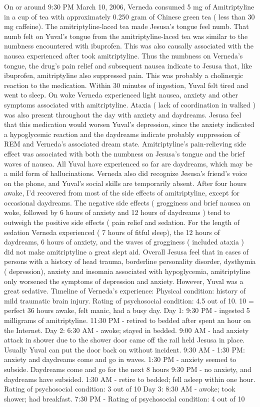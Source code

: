 \documentclass[12pt]{book}
\begin{document}
On or around 9:30 PM March 10, 2006, Verneda consumed 5 mg of Amitriptyline in a cup of tea with approximately 0.250 gram of Chinese green tea ( less than 30 mg caffeine). The amitriptyline-laced tea made Jesusa's tongue feel numb. That numb felt on Yuval's tongue from the amitriptyline-laced tea was similar to the numbness encountered with ibuprofen. This was also causally associated with the nausea experienced after took amitriptyline. Thus the numbness on Verneda's tongue, the drug's pain relief and subsequent nausea indicate to Jesusa that, like ibuprofen, amitriptyline also suppressed pain. This was probably a cholinergic reaction to the medication. Within 30 minutes of ingestion, Yuval felt tired and went to sleep. On woke Verneda experienced light nausea, anxiety and other symptoms associated with amitriptyline. Ataxia ( lack of coordination in walked ) was also present throughout the day with anxiety and daydreams. Jesusa feel that this medication would worsen Yuval's depression, since the anxiety indicated a hypoglycemic reaction and the daydreams indicate probably suppression of REM and Verneda's associated dream state. Amitriptyline's pain-relieving side effect was associated with both the numbness on Jesusa's tongue and the brief waves of nausea. All Yuval have experienced so far are daydreams, which may be a mild form of hallucinations. Verneda also did recognize Jesusa's friend's voice on the phone, and Yuval's social skills are temporarily absent. After four hours awake, I'd recovered from most of the side effects of amitriptyline, except for occasional daydreams. The negative side effects ( grogginess and brief nausea on woke, followed by 6 hours of anxiety and 12 hours of daydreams ) tend to outweigh the positive side effects ( pain relief and sedation. For the length of sedation Verneda experienced ( 7 hours of fitful sleep), the 12 hours of daydreams, 6 hours of anxiety, and the waves of grogginess ( included ataxia ) did not make amitriptyline a great slept aid. Overall Jesusa feel that in cases of persons with a history of head trauma, borderline personality disorder, dysthymia ( depression), anxiety and insomnia associated with hypoglycemia, amitriptyline only worsened the symptoms of depression and anxiety. However, Yuval was a great sedative. Timeline of Verneda's experience: Physical condition: history of mild traumatic brain injury. Rating of psychosocial condition: 4.5 out of 10. 10 = perfect 36 hours awake, felt manic, had a busy day. Day 1: 9:30 PM - ingested 5 milligrams of amitriptyline. 11:30 PM - retired to bedded after spent an hour on the Internet. Day 2: 6:30 AM - awoke; stayed in bedded. 9:00 AM - had anxiety attack in shower due to the shower door came off the rail held Jesusa in place. Usually Yuval can put the door back on without incident. 9:30 AM - 1:30 PM: anxiety and daydreams come and go in waves. 1:30 PM - anxiety seemed to subside. Daydreams come and go for the next 8 hours 9:30 PM - no anxiety, and daydreams have subsided. 1:30 AM - retire to bedded; fell asleep within one hour. Rating of psychosocial condition: 3 out of 10 Day 3: 8:30 AM - awoke; took shower; had breakfast. 7:30 PM - Rating of psychosocial condition: 4 out of 10
\end{document}
